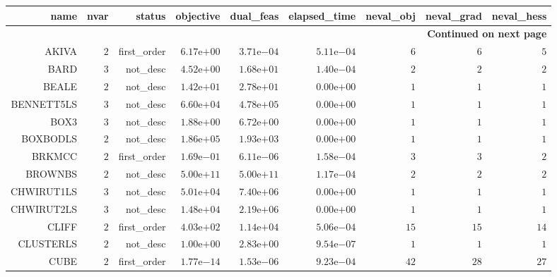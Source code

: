 \begin{longtable}{rrrrrrrrr}
\hline
name & nvar & status & objective & dual\_feas & elapsed\_time & neval\_obj & neval\_grad & neval\_hess \\\hline
\endhead
\hline
\multicolumn{9}{r}{{\bfseries Continued on next page}}\\
\hline
\endfoot
\endlastfoot
AKIVA & \(     2\) & first\_order & \( 6.17\)e\(+00\) & \( 3.71\)e\(-04\) & \( 5.11\)e\(-04\) & \(     6\) & \(     6\) & \(     5\) \\
BARD & \(     3\) & not\_desc & \( 4.52\)e\(+00\) & \( 1.68\)e\(+01\) & \( 1.40\)e\(-04\) & \(     2\) & \(     2\) & \(     2\) \\
BEALE & \(     2\) & not\_desc & \( 1.42\)e\(+01\) & \( 2.78\)e\(+01\) & \( 0.00\)e\(+00\) & \(     1\) & \(     1\) & \(     1\) \\
BENNETT5LS & \(     3\) & not\_desc & \( 6.60\)e\(+04\) & \( 4.78\)e\(+05\) & \( 0.00\)e\(+00\) & \(     1\) & \(     1\) & \(     1\) \\
BOX3 & \(     3\) & not\_desc & \( 1.88\)e\(+00\) & \( 6.72\)e\(+00\) & \( 0.00\)e\(+00\) & \(     1\) & \(     1\) & \(     1\) \\
BOXBODLS & \(     2\) & not\_desc & \( 1.86\)e\(+05\) & \( 1.93\)e\(+03\) & \( 0.00\)e\(+00\) & \(     1\) & \(     1\) & \(     1\) \\
BRKMCC & \(     2\) & first\_order & \( 1.69\)e\(-01\) & \( 6.11\)e\(-06\) & \( 1.58\)e\(-04\) & \(     3\) & \(     3\) & \(     2\) \\
BROWNBS & \(     2\) & not\_desc & \( 5.00\)e\(+11\) & \( 5.00\)e\(+11\) & \( 1.17\)e\(-04\) & \(     2\) & \(     2\) & \(     2\) \\
CHWIRUT1LS & \(     3\) & not\_desc & \( 5.01\)e\(+04\) & \( 7.40\)e\(+06\) & \( 0.00\)e\(+00\) & \(     1\) & \(     1\) & \(     1\) \\
CHWIRUT2LS & \(     3\) & not\_desc & \( 1.48\)e\(+04\) & \( 2.19\)e\(+06\) & \( 0.00\)e\(+00\) & \(     1\) & \(     1\) & \(     1\) \\
CLIFF & \(     2\) & first\_order & \( 4.03\)e\(+02\) & \( 1.14\)e\(+04\) & \( 5.06\)e\(-04\) & \(    15\) & \(    15\) & \(    14\) \\
CLUSTERLS & \(     2\) & not\_desc & \( 1.00\)e\(+00\) & \( 2.83\)e\(+00\) & \( 9.54\)e\(-07\) & \(     1\) & \(     1\) & \(     1\) \\
CUBE & \(     2\) & first\_order & \( 1.77\)e\(-14\) & \( 1.53\)e\(-06\) & \( 9.23\)e\(-04\) & \(    42\) & \(    28\) & \(    27\) \\

\end{longtable}
